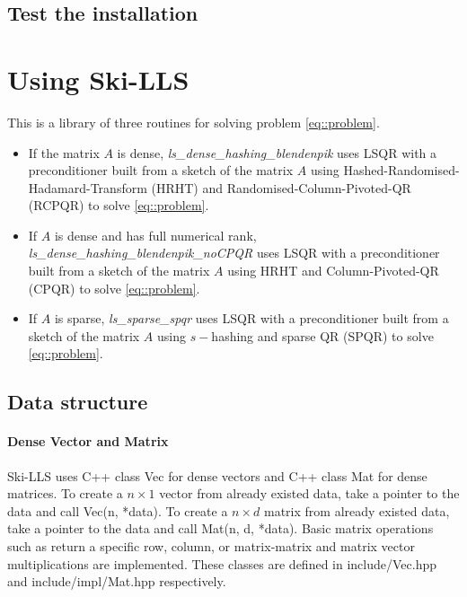 \documentclass[english,11pt]{article}
\begin{document}
\subsection{Test the installation}

\section{Using Ski-LLS}

This is a library of three routines for solving problem \eqref{eq::problem}. 

\begin{itemize}
	\item If the matrix $A$ is dense, {\it ls_dense_hashing_blendenpik} uses LSQR with a preconditioner built from a sketch of the matrix $A$ using Hashed-Randomised-Hadamard-Transform (HRHT) and Randomised-Column-Pivoted-QR (RCPQR) to solve \eqref{eq::problem}.

	\item If $A$ is dense and has full numerical rank, {\it ls_dense_hashing_blendenpik_noCPQR} uses LSQR with a preconditioner built from a sketch of the matrix $A$ using HRHT and Column-Pivoted-QR (CPQR) to solve \eqref{eq::problem}.

	\item   If $A$ is sparse, {\it ls_sparse_spqr} uses LSQR with a preconditioner built from a sketch of the matrix $A$ using $s-$hashing and sparse QR (SPQR) to solve \eqref{eq::problem}.
\end{itemize}

\subsection{Data structure}

\paragraph{Dense Vector and Matrix}
Ski-LLS uses C++ class Vec for dense vectors and C++ class Mat for dense matrices. 
To create a $n\times 1$ vector from already existed data, take a pointer to the data and call Vec(n, *data). 
To create a $n \times d$ matrix from already existed data, take a pointer to the data and call Mat(n, d, *data). Basic matrix operations such as return a specific row, column, or matrix-matrix and matrix vector multiplications are implemented.  
These classes are defined in include/Vec.hpp and include/impl/Mat.hpp respectively. 
\end{document}
